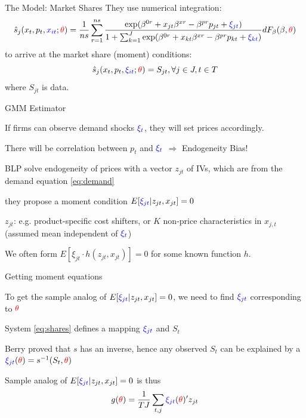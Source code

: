 \documentclass[english]{beamer}
\begin{document}
\begin{frame}{The Model: Market Shares}
They use numerical integration:
\begin{equation}
\hat{s}_j(x_t,p_t,{\color{blue}{x_{it}}};{\color{red}{\theta}})  = \frac{1}{ns} \sum_{r=1}^{ns} \frac{\exp(\beta^{0r} + x_{jt}\beta^{xr} - \beta^{pr} p_{jt} + {\color{blue}{\xi_{jt}}})}{1+\sum_{k=1}^J \exp(\beta^{0r} + x_{kt}\beta^{xr} - \beta^{pr} p_{kt} + {\color{blue}{\xi_{kt}}})} dF_\beta(\beta,{\color{red}{\theta}})
\end{equation}
to arrive at the market share (moment) conditions:
\begin{equation}
\hat{s}_j(x_t,p_t,{\color{blue}{\xi_{it}}};{\color{red}{\theta}}) = S_{jt},\forall j \in J,t\in T  \label{eq:shares}
\end{equation}
where $S_{jt}$ is data.
\end{frame}

\begin{frame}{GMM Estimator}
\begin{midi}
\item If firms can observe demand shocks ${\color{blue}{\xi_t}}$, they will set prices accordingly.
\item There will be correlation between $p_t$ and ${\color{blue}{\xi_t}}$ $\Rightarrow$ Endogeneity Bias!
\item BLP solve endogeneity of prices with a vector $z_{jt}$ of IVs, which are  from the demand equation \eqref{eq:demand}
\item they propose a moment condition $E[{\color{blue}{\xi_{jt}}}|z_{jt},x_{jt}] = 0 $
\item $z_{jt}$: e.g. product-specific cost shifters, or $K$ non-price characteristics in $x_{j,t}$ (assumed mean independent of ${\color{blue}{\xi_t}}$)
\item We often form $E[\xi_{jt} \cdot h(z_{jt},x_{jt})] = 0 $ for some known function $h$.
\end{midi}
\end{frame}

\begin{frame}{Getting moment equations}
\begin{midi}
\item To get the sample analog of $E[{\color{blue}{\xi_{jt}}}|z_{jt},x_{jt}] = 0$, we need to find ${\color{blue}{\xi_{jt}}}$ corresponding to ${\color{red}{\theta}}$
\item System \eqref{eq:shares} defines a mapping ${\color{blue}{\xi_{jt}}}$ and $S_t$
\item Berry proved that $s$ has an inverse, hence any observed $S_t$ can be explained by a  ${\color{blue}{\xi_{jt}}}({\color{red}{\theta}}) = s^{-1}(S_t,{\color{red}{\theta}})$
\item Sample analog of $E[{\color{blue}{\xi_{jt}}}|z_{jt},x_{jt}] = 0$ is thus
\begin{equation*}
g({\color{red}{\theta}}) = \frac{1}{TJ}\sum_{t,j} {\color{blue}{\xi_{jt}}}({\color{red}{\theta}})' z_{jt}
\end{equation*}
\end{midi}
\end{frame}
\end{document}
